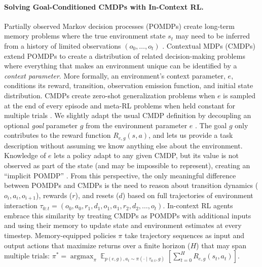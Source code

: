 \documentclass{article}
\begin{document}
\paragraph{Solving Goal-Conditioned CMDPs with In-Context RL.} Partially observed Markov decision processes (POMDPs) create long-term memory problems where the true environment state $s_t$ may need to be inferred from a history of limited observations $(o_0, \dots, o_t)$ \cite{cassandra1994acting}. Contextual MDPs (CMDPs) \cite{hallak2015contextual, kirk2022survey, perez2020generalized} extend POMDPs to create a distribution of related decision-making problems where everything that makes an environment unique can be identified by a \textit{context parameter}. More formally, an environment's context parameter, $e$, conditions its reward, transition, observation emission function, and initial state distribution. CMDPs create zero-shot generalization problems when $e$ is sampled at the end of every episode \cite{kirk2022survey} and meta-RL problems when held constant for multiple trials \cite{beck2023survey}. We slightly adapt the usual CMDP definition by decoupling an optional \textit{goal} parameter $g$ from the environment parameter $e$ \cite{liu2021decoupling}. The goal $g$ only contributes to the reward function $R_{e, g}(s, a)$, and lets us provide a task description without assuming we know anything else about the environment.
Knowledge of $e$ lets a policy adapt to any given CMDP, but its value is not observed as part of the state (and may be impossible to represent), creating an ``implicit POMDP'' \cite{ghosh2021generalization, humplik2019meta}. From this perspective, the only meaningful difference between POMDPs and CMDPs is the need to reason about transition dynamics ($o_i, a_i, o_{i+1}$), rewards ($r$), and resets ($d$) based on full trajectories of environment interaction $\tau_{0:t} = (o_0, a_0, r_1, d_1, o_1, a_1, r_2, d_2, \dots, o_t)$. In-context RL agents embrace this similarity by treating CMDPs as POMDPs with additional inputs and using their memory to update state and environment estimates at every timestep. Memory-equipped policies $\pi$ take trajectory sequences as input and output actions that maximize returns over a finite horizon ($H$) that may span multiple trials: $\pi^* = \mathop{\text{argmax}}_{\pi} \mathop{\mathbb{E}}_{p(e, g), a_t \sim \pi(\cdot \mid \tau_{0:t}, g)}\left[\sum_{t=0}^{H}R_{e, g}(s_t, a_t)\right]$.
\end{document}
